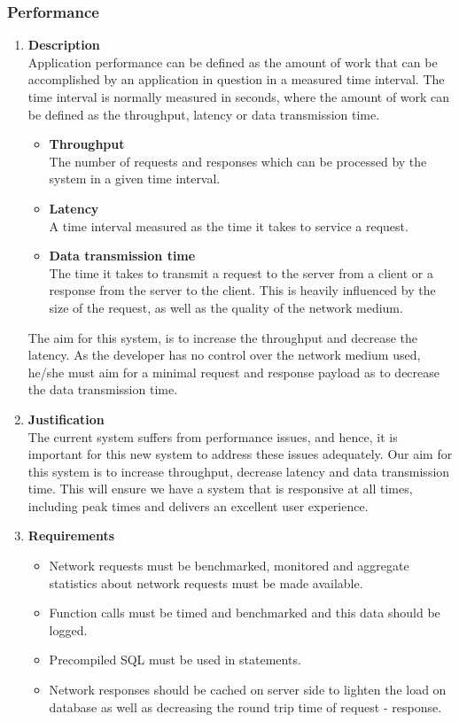\documentclass[a4paper,10pt]{article}
\begin{document}
	\subsubsection{Performance}
		\begin{enumerate}
			\item \textbf{Description} \\
				Application performance can be defined as the amount of work that can be accomplished by an application in question in a measured time interval. The time interval is normally measured in seconds, where the amount of work can be defined as the throughput, latency or data transmission time.
				\begin{itemize}
					\item \textbf{Throughput} \\
					The number of requests and responses which can be processed by the system in a given time interval.
					\item \textbf{Latency} \\
					A time interval measured as the time it takes to service a request.
					\item \textbf{Data transmission time} \\
					The time it takes to transmit a request to the server from a client or a response from the server to the client. This is heavily influenced by the size of the request, as well as the quality of the network medium.
				\end{itemize}

				The aim for this system, is to increase the throughput and decrease the latency. As the developer has no control over the network medium used, he/she must aim for a minimal request and response payload as to decrease the data transmission time.

			\item \textbf{Justification} \\
				The current system suffers from performance issues, and hence, it is important for this new system to address these issues adequately. Our aim for this system is to increase throughput, decrease latency and data transmission time. This will ensure we have a system that is responsive at all times, including peak times and delivers an excellent user experience.

			\item \textbf{Requirements}\\
				\begin{itemize}
					\item Network requests must be benchmarked, monitored and aggregate statistics about network requests must be made available.
					\item Function calls must be timed and benchmarked and this data should be logged.
					\item Precompiled SQL must be used in statements.
					\item Network responses should be cached on server side to lighten the load on database as well as decreasing the round trip time of request - response.
				\end{itemize}
		\end{enumerate}
\end{document}
